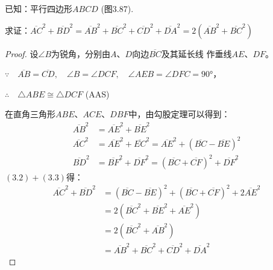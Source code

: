 已知：平行四边形$ABCD$ (图3.87). 

求证：$\overline{AC}^2+\overline{BD}^2=\overline{AB}^2+\overline{BC}^2+\overline{CD}^2+\overline{DA}^2=2\left(\overline{AB}^2+\overline{BC}^2\right)$

\begin{proof}
    设$\angle B$为锐角，分别由$A$、$D$向边$\overline{BC}$及其延长线
    作垂线$AE$、$DF$。

$\because\quad \overline{AB}=\overline{CD},\quad \angle B=\angle DCF,\quad \angle AEB=\angle DFC=\ang{90}$，

$\therefore\quad \triangle ABE\cong \triangle DCF$ (AAS)

    在直角三角形$ABE$、$ACE$、$DBF$中，由勾股定理可以得到：
\begin{align}
    \overline{AB}^2&=\overline{AE}^2+\overline{BE}^2\\
    \overline{AC}^2&=\overline{AE}^2+\overline{EC}^2=\overline{AE}^2+\left(\overline{BC}-\overline{BE}\right)^2\\
    \overline{BD}^2&=\overline{BF}^2+\overline{DF}^2=\left(\overline{BC}+\overline{CF}\right)^2+\overline{DF}^2
\end{align}
$(3.2)+(3.3)$得：
\[\begin{split}
    \overline{AC}^2+\overline{BD}^2&=\left(\overline{BC}-\overline{BE}\right)^2+\left(\overline{BC}+\overline{CF}\right)^2+2\overline{AE}^2\\
    &=2\left(\overline{BC}^2+\overline{BE}^2+\overline{AE}^2\right)\\
    &=2\left(\overline{BC}^2+\overline{AB}^2\right)\\
    &=\overline{AB}^2+\overline{BC}^2+\overline{CD}^2+\overline{DA}^2
\end{split}\]
\end{proof}

\begin{figure}
    \begin{minipage}[t]{0.48\linewidth}
    \centering
\begin{tikzpicture}[>=latex, scale=1]

    \end{tikzpicture}
    \caption{}
    \end{minipage}
    \begin{minipage}[t]{0.48\linewidth}
    \centering
    \begin{tikzpicture}[>=latex, scale=1]
    \end{tikzpicture}
    \caption{}
    \end{minipage}
    \end{figure}

